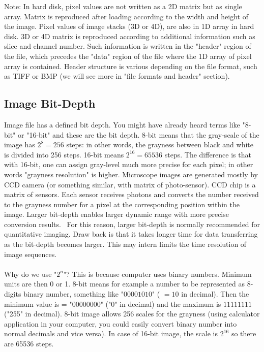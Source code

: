 Note: In hard disk, pixel values are not written as a 2D matrix but as
single array. Matrix is reproduced after loading according to the width
and height of the image. Pixel values of image stacks (3D or 4D), are
also in 1D array in hard disk. 3D or 4D matrix is reproduced according
to additional information such as slice and channel number. Such
information is written in the
"header" region of the file, which
precedes the "data" region of the
file where the 1D array of pixel array is contained. Header structure
is various depending on the file format, such as TIFF or BMP (we will
see more in "file formats and
header" section). 



\subsection{Image Bit-Depth}

Image file has a defined bit depth. You might have already
heard terms like "8-bit" or
"16-bit" and these are the bit depth. 8-bit
means that the gray-scale of the image has $2^{8} = 256$
steps: in other words, the grayness between black and white is divided
into 256 steps. 16-bit means $2^{16} = 65536$ steps. The
difference is that with 16-bit, one can assign gray-level much more
precise for each pixel; in other words "grayness
resolution" is higher. Microscope images are generated
mostly by CCD camera (or something similar, with matrix of
photo-sensor). CCD chip is a matrix of sensors. Each sensor receives
photons and converts the number received to the grayness number for a
pixel at the corresponding position within the image. Larger bit-depth
enables larger dynamic range with more precise conversion results.~ For
this reason, larger bit-depth is normally recommended for quantitative
imaging. Draw back is that it takes longer time for data transferring
as the bit-depth becomes larger. This may intern limits the time
resolution of image sequences. \\
~\\
Why do we use "$2^{n}$"? This
is because computer uses binary numbers. Minimum units are then 0 or 1.
8-bit means for example a number to be represented as 8-digits binary
number, something like "$00001010$" ( $= 10$ in
decimal). Then the minimum value is =
"$00000000$" ("0" in decimal) and the maximum is $11111111$
("255" in decimal). 8-bit image allows 256
scales for the grayness (using calculator application in your computer,
you could easily convert binary number into normal decimals and vice
versa). In case of 16-bit image, the scale is $2^{16}$ so
there are 65536 steps. 



